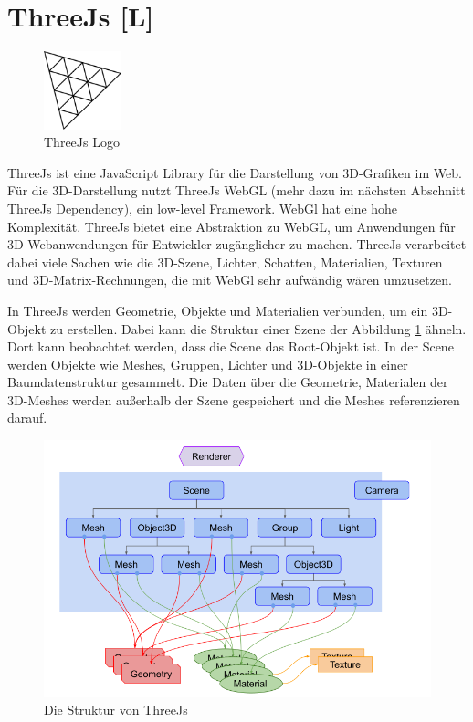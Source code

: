 \section{ThreeJs [L]}
\begin{figure}
    \begin{center}
      \includegraphics[width=0.2\textwidth]{pics/threeJS.png}
     \caption{ThreeJs Logo}
    \end{center}
\end{figure}
ThreeJs ist eine JavaScript Library für die Darstellung von 3D-Grafiken im Web. Für die 3D-Darstellung nutzt ThreeJs WebGL (mehr dazu im nächsten Abschnitt \hyperref[ch::ThreeJsDependency]{ThreeJs Dependency}), ein low-level Framework. WebGl hat eine hohe Komplexität. ThreeJs bietet eine Abstraktion zu WebGL, um Anwendungen für 3D-Webanwendungen für Entwickler zugänglicher zu machen. ThreeJs verarbeitet dabei viele Sachen wie die 3D-Szene, Lichter, Schatten, Materialien, Texturen und 3D-Matrix-Rechnungen, die mit WebGl sehr aufwändig wären umzusetzen.

In ThreeJs werden Geometrie, Objekte und Materialien verbunden, um ein 3D-Objekt zu erstellen. Dabei kann die Struktur einer Szene der Abbildung \ref{fig:tech:front:threejsstructure} ähneln. Dort kann beobachtet werden, dass die Scene das Root-Objekt ist. In der Scene werden Objekte wie Meshes, Gruppen, Lichter und 3D-Objekte in einer Baumdatenstruktur gesammelt. Die Daten über die Geometrie, Materialen der 3D-Meshes werden außerhalb der Szene gespeichert und die Meshes referenzieren darauf.

\cite[ThreeJs fundamentals]{ThreeJsFund}

\begin{figure} [h t]
    \centering
    \includegraphics[scale=0.5]{pics/threejs-structure.png}
    \caption{Die Struktur von ThreeJs \cite{ThreeJsFund}}
    \label{fig:tech:front:threejsstructure}
\end{figure}

